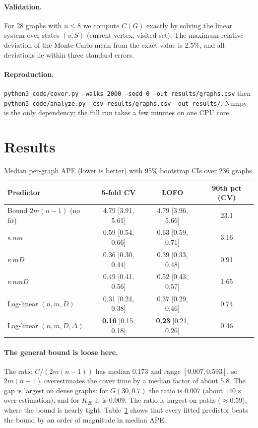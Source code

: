 \documentclass{article} %
\newcommand{\cover}{C}
\begin{document}
\paragraph{Validation.} For 28 graphs with $n\le 8$ we compute $\cover(G)$ exactly by solving the linear system over states $(v,S)$ (current vertex, visited set). The maximum relative deviation of the Monte Carlo mean from the exact value is 2.5\%, and all deviations lie within three standard errors.

\paragraph{Reproduction.} \texttt{python3 code/cover.py --walks 2000 --seed 0 --out results/graphs.csv} then \texttt{python3 code/analyze.py --csv results/graphs.csv --out results/}. Numpy is the only dependency; the full run takes a few minutes on one CPU core.

\section{Results}
\begin{table}[t]
\centering
\caption{Median per-graph APE (lower is better) with 95\% bootstrap CIs over 236 graphs.}
\label{tab:main}
\begin{tabular}{lccc}
\toprule
Predictor & 5-fold CV & LOFO & 90th pct (CV)\\
\midrule
Bound $2m(n-1)$ (no fit) & 4.79 [3.91, 5.61] & 4.79 [3.96, 5.66] & 23.1\\
$\kappa\, nm$ & 0.59 [0.54, 0.66] & 0.63 [0.59, 0.71] & 3.16\\
$\kappa\, mD$ & 0.36 [0.30, 0.44] & 0.39 [0.33, 0.48] & 0.91\\
$\kappa\, nmD$ & 0.49 [0.41, 0.56] & 0.52 [0.43, 0.57] & 1.65\\
Log-linear $(n,m,D)$ & 0.31 [0.24, 0.38] & 0.37 [0.29, 0.46] & 0.74\\
Log-linear $(n,m,D,\Delta)$ & \textbf{0.16} [0.15, 0.18] & \textbf{0.23} [0.21, 0.26] & 0.46\\
\bottomrule
\end{tabular}
\end{table}

\paragraph{The general bound is loose here.} The ratio $\cover/(2m(n-1))$ has median $0.173$ and range $[0.007, 0.593]$, so $2m(n-1)$ overestimates the cover time by a median factor of about 5.8. The gap is largest on dense graphs: for $G(30,0.7)$ the ratio is $0.007$ (about $140\times$ over-estimation), and for $K_{20}$ it is $0.009$. The ratio is largest on paths ($\approx 0.59$), where the bound is nearly tight. Table~\ref{tab:main} shows that every fitted predictor beats the bound by an order of magnitude in median APE.
\end{document}
